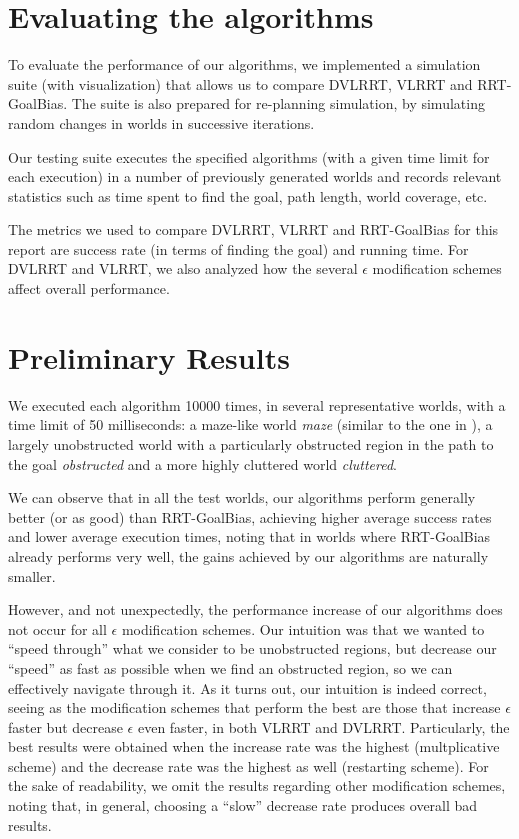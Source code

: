\documentclass[10pt,twoside,twocolumn]{article}
\begin{document}
\section{Evaluating the algorithms}

To evaluate the performance of our algorithms, we implemented a simulation suite (with visualization) that allows
us to compare DVLRRT, VLRRT and RRT-GoalBias. The suite is also prepared for re-planning simulation, by simulating
random changes in worlds in successive iterations.

Our testing suite executes the specified algorithms (with a given time limit for each execution) in a number of previously
generated worlds and records relevant statistics such as time spent to find the goal, path length, world coverage, etc.

The metrics we used to compare DVLRRT, VLRRT and RRT-GoalBias for this report are success rate (in terms of finding the goal) and running
time. For DVLRRT and VLRRT, we also analyzed how the several $\epsilon$ modification schemes affect overall performance.

\section{Preliminary Results}

We executed each algorithm 10000 times, in several representative worlds, with a time limit of 50 milliseconds: 
a maze-like world \emph{maze} (similar to the one in
\cite{Bruce02real-timerandomized}), a largely unobstructed world with
a particularly obstructed region 
in the path to the goal \emph{obstructed} and a more highly cluttered world \emph{cluttered}.

We can observe that in all the test worlds, our algorithms perform
generally better (or as good) than RRT-GoalBias,
achieving higher average success rates and lower average execution
times, noting that in worlds where RRT-GoalBias already performs
very well, the gains achieved by our algorithms are naturally smaller.

However, and not unexpectedly, the performance increase of our algorithms does not occur for all
$\epsilon$ modification schemes.
Our intuition was that we wanted to ``speed through'' what we consider to be unobstructed regions, but decrease our
``speed'' as fast as possible when we find an obstructed region, so we can effectively navigate through it. As it turns
out, our intuition is indeed correct, seeing as the modification schemes that perform the best are those that
increase $\epsilon$ faster but decrease $\epsilon$ even faster, in both VLRRT and DVLRRT. Particularly, the best
results were obtained when the increase rate was the highest (multplicative scheme) and the decrease rate was the 
highest as well (restarting scheme). For the sake of readability, we
omit the results regarding other modification schemes, noting that, in
general, choosing a ``slow'' decrease rate produces overall bad
results.
\end{document}
